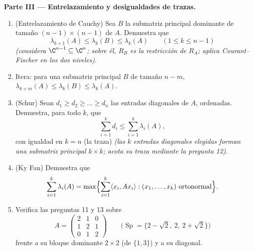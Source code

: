 \begin{problem}
\medskip
\noindent\textbf{Parte III --- Entrelazamiento y desigualdades de
trazas.}
\begin{enumerate}[resume]
  \item (Entrelazamiento de Cauchy) Sea $B$ la submatriz principal
        dominante de tamaño $(n-1)\times(n-1)$ de $A$. Demuestra que
        \[
        \lambda_{k+1}(A) \leq \lambda_k(B) \leq \lambda_k(A)
        \qquad (1 \leq k \leq n-1)
        \]
        \emph{(considera $\C^{n-1} \subseteq \C^n$; sobre él, $R_B$
        es la restricción de $R_A$; aplica Courant--Fischer en los
        dos niveles)}.
  \item Itera: para una submatriz principal $B$ de tamaño $n - m$,
        $\lambda_{k+m}(A) \leq \lambda_k(B) \leq \lambda_k(A)$.
  \item (Schur) Sean $d_1 \geq d_2 \geq \dots \geq d_n$ las entradas
        diagonales de $A$, ordenadas. Demuestra, para todo $k$, que
        \[
        \sum_{i=1}^{k} d_i \leq \sum_{i=1}^{k}\lambda_i(A),
        \]
        con igualdad en $k = n$ (la traza) \emph{(las $k$ entradas
        diagonales elegidas forman una submatriz principal $k\times
        k$; acota su traza mediante la pregunta 12)}.
  \item (Ky Fan) Demuestra que
        \[
        \sum_{i=1}^{k}\lambda_i(A)
        = \max\Bigl\{\sum_{i=1}^{k}\langle x_i, Ax_i\rangle
        : (x_1, \dots, x_k) \text{ ortonormal}\Bigr\} .
        \]
  \item Verifica las preguntas 11 y 13 sobre
        \[
        A = \begin{pmatrix} 2 & 1 & 0\\ 1 & 2 & 1\\
        0 & 1 & 2\end{pmatrix}
        \qquad
        \bigl(\operatorname{Sp} = \{2 - \sqrt2,\ 2,\
        2+\sqrt2\}\bigr)
        \]
        frente a su bloque dominante $2\times2$ (de  $\{1,
        3\}$) y a su diagonal.
\end{enumerate}


\end{problem}
